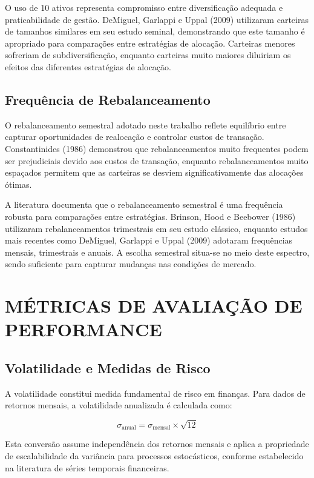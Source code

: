 O uso de 10 ativos representa compromisso entre diversificação adequada e praticabilidade de gestão. DeMiguel, Garlappi e Uppal (2009) utilizaram carteiras de tamanhos similares em seu estudo seminal, demonstrando que este tamanho é apropriado para comparações entre estratégias de alocação. Carteiras menores sofreriam de subdiversificação, enquanto carteiras muito maiores diluiriam os efeitos das diferentes estratégias de alocação.

\subsection{Frequência de Rebalanceamento}

O rebalanceamento semestral adotado neste trabalho reflete equilíbrio entre capturar oportunidades de realocação e controlar custos de transação. Constantinides (1986) demonstrou que rebalanceamentos muito frequentes podem ser prejudiciais devido aos custos de transação, enquanto rebalanceamentos muito espaçados permitem que as carteiras se desviem significativamente das alocações ótimas.

A literatura documenta que o rebalanceamento semestral é uma frequência robusta para comparações entre estratégias. Brinson, Hood e Beebower (1986) utilizaram rebalanceamentos trimestrais em seu estudo clássico, enquanto estudos mais recentes como DeMiguel, Garlappi e Uppal (2009) adotaram frequências mensais, trimestrais e anuais. A escolha semestral situa-se no meio deste espectro, sendo suficiente para capturar mudanças nas condições de mercado.

\section{MÉTRICAS DE AVALIAÇÃO DE PERFORMANCE}

\subsection{Volatilidade e Medidas de Risco}

A volatilidade constitui medida fundamental de risco em finanças. Para dados de retornos mensais, a volatilidade anualizada é calculada como:

\begin{equation}
\sigma_{\text{anual}} = \sigma_{\text{mensal}} \times \sqrt{12}
\end{equation}

Esta conversão assume independência dos retornos mensais e aplica a propriedade de escalabilidade da variância para processos estocásticos, conforme estabelecido na literatura de séries temporais financeiras.

